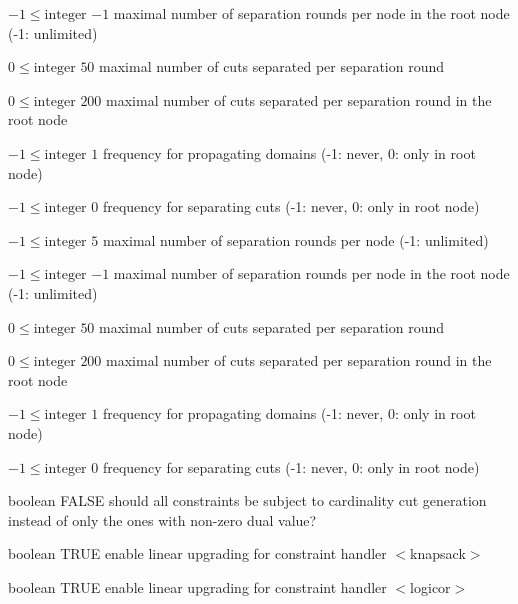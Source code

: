 %
{$-1\leq\textrm{integer}$}%
{$-1$}%
{maximal number of separation rounds per node in the root node (-1: unlimited)}%
{}

%
{$0\leq\textrm{integer}$}%
{$50$}%
{maximal number of cuts separated per separation round}%
{}

%
{$0\leq\textrm{integer}$}%
{$200$}%
{maximal number of cuts separated per separation round in the root node}%
{}

%
{$-1\leq\textrm{integer}$}%
{$1$}%
{frequency for propagating domains (-1: never, 0: only in root node)}%
{}

%
{$-1\leq\textrm{integer}$}%
{$0$}%
{frequency for separating cuts (-1: never, 0: only in root node)}%
{}

%
{$-1\leq\textrm{integer}$}%
{$5$}%
{maximal number of separation rounds per node (-1: unlimited)}%
{}

%
{$-1\leq\textrm{integer}$}%
{$-1$}%
{maximal number of separation rounds per node in the root node (-1: unlimited)}%
{}

%
{$0\leq\textrm{integer}$}%
{$50$}%
{maximal number of cuts separated per separation round}%
{}

%
{$0\leq\textrm{integer}$}%
{$200$}%
{maximal number of cuts separated per separation round in the root node}%
{}

%
{$-1\leq\textrm{integer}$}%
{$1$}%
{frequency for propagating domains (-1: never, 0: only in root node)}%
{}

%
{$-1\leq\textrm{integer}$}%
{$0$}%
{frequency for separating cuts (-1: never, 0: only in root node)}%
{}

%
{boolean}%
{FALSE}%
{should all constraints be subject to cardinality cut generation instead of only the ones with non-zero dual value?}%
{}

%
{boolean}%
{TRUE}%
{enable linear upgrading for constraint handler $<$knapsack$>$}%
{}

%
{boolean}%
{TRUE}%
{enable linear upgrading for constraint handler $<$logicor$>$}%
{}

